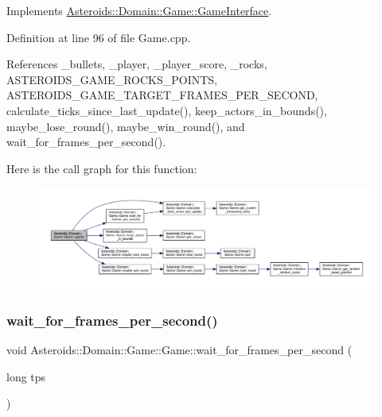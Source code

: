 Implements \hyperlink{classAsteroids_1_1Domain_1_1Game_1_1GameInterface_a34d23ca6c1559d84f99a8aeec8ead3ed}{Asteroids\+::\+Domain\+::\+Game\+::\+Game\+Interface}.



Definition at line 96 of file Game.\+cpp.



References \+\_\+bullets, \+\_\+player, \+\_\+player\+\_\+score, \+\_\+rocks, A\+S\+T\+E\+R\+O\+I\+D\+S\+\_\+\+G\+A\+M\+E\+\_\+\+R\+O\+C\+K\+S\+\_\+\+P\+O\+I\+N\+TS, A\+S\+T\+E\+R\+O\+I\+D\+S\+\_\+\+G\+A\+M\+E\+\_\+\+T\+A\+R\+G\+E\+T\+\_\+\+F\+R\+A\+M\+E\+S\+\_\+\+P\+E\+R\+\_\+\+S\+E\+C\+O\+ND, calculate\+\_\+ticks\+\_\+since\+\_\+last\+\_\+update(), keep\+\_\+actors\+\_\+in\+\_\+bounds(), maybe\+\_\+lose\+\_\+round(), maybe\+\_\+win\+\_\+round(), and wait\+\_\+for\+\_\+frames\+\_\+per\+\_\+second().

Here is the call graph for this function\+:\nopagebreak
\begin{figure}[H]
\begin{center}
\leavevmode
\includegraphics[width=350pt]{classAsteroids_1_1Domain_1_1Game_1_1Game_aa63114be578393b0113f116798346ac4_cgraph}
\end{center}
\end{figure}
\mbox{\label{classAsteroids_1_1Domain_1_1Game_1_1Game_ab586cddf7972dbb9313ad3b241b550b4}} 
\subsubsection{\texorpdfstring{wait\+\_\+for\+\_\+frames\+\_\+per\+\_\+second()}{wait\_for\_frames\_per\_second()}}
{\footnotesize\ttfamily void Asteroids\+::\+Domain\+::\+Game\+::\+Game\+::wait\+\_\+for\+\_\+frames\+\_\+per\+\_\+second (\begin{DoxyParamCaption}\item[{long}]{tps }\end{DoxyParamCaption})\hspace{0.3cm}{\ttfamily [virtual]}}



